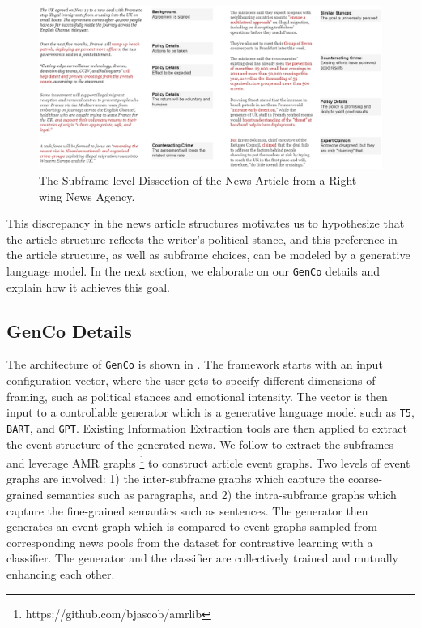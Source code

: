 \begin{figure}[ht!]
    \centering
    \includegraphics[width=\textwidth]{img/genco-motivation-right}
    \caption{The Subframe-level Dissection of the News Article from a Right-wing News Agency.}
    \label{fig:genco-motivation-right}
\end{figure}

This discrepancy in the news article structures motivates us to hypothesize that the article structure reflects the writer's political stance, and this preference in the article structure, as well as subframe choices, can be modeled by a generative language model. In the next section, we elaborate on our \texttt{GenCo} details and explain how it achieves this goal.

\subsection{GenCo Details}
\label{genco-details}
The architecture of \texttt{GenCo} is shown in . The framework starts with an input configuration vector, where the user gets to specify different dimensions of framing, such as political stances and emotional intensity. The vector is then input to a controllable generator which is a generative language model such as \texttt{T5}, \texttt{BART}, and \texttt{GPT}. Existing Information Extraction tools are then applied to extract the event structure of the generated news. We follow \cite{roy-goldwasser-2020-weakly} to extract the subframes and leverage AMR graphs \footnote{https://github.com/bjascob/amrlib} to construct article event graphs. Two levels of event graphs are involved: 1) the inter-subframe graphs which capture the coarse-grained semantics such as paragraphs, and 2) the intra-subframe graphs which capture the fine-grained semantics such as sentences. The generator then generates an event graph which is compared to event graphs sampled from corresponding news pools from the dataset for contrastive learning with a classifier. The generator and the classifier are collectively trained and mutually enhancing each other.

